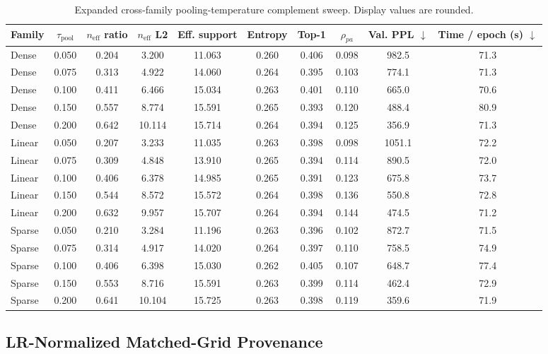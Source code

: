 \documentclass{article}
\theoremstyle{plain}
\theoremstyle{definition}
\theoremstyle{remark}
\begin{document}
\begin{table}[t]
\centering
\caption{Expanded cross-family pooling-temperature complement sweep. Display values are rounded.}
\label{tab:pooltau-family-complements}
\small
\begin{tabular}{lccccccccc}
\toprule
Family & $\tau_{\mathrm{pool}}$ & $n_{\mathrm{eff}}$ ratio & $n_{\mathrm{eff}}$ L2 & Eff. support & Entropy & Top-1 & $\rho_{pa}$ & Val. PPL $\downarrow$ & Time / epoch (s) $\downarrow$ \\
\midrule
Dense & 0.050 & 0.204 & 3.200 & 11.063 & 0.260 & 0.406 & 0.098 & 982.5 & 71.3 \\
Dense & 0.075 & 0.313 & 4.922 & 14.060 & 0.264 & 0.395 & 0.103 & 774.1 & 71.3 \\
Dense & 0.100 & 0.411 & 6.466 & 15.034 & 0.263 & 0.401 & 0.110 & 665.0 & 70.6 \\
Dense & 0.150 & 0.557 & 8.774 & 15.591 & 0.265 & 0.393 & 0.120 & 488.4 & 80.9 \\
Dense & 0.200 & 0.642 & 10.114 & 15.714 & 0.264 & 0.394 & 0.125 & 356.9 & 71.3 \\
Linear & 0.050 & 0.207 & 3.233 & 11.035 & 0.263 & 0.398 & 0.098 & 1051.1 & 72.2 \\
Linear & 0.075 & 0.309 & 4.848 & 13.910 & 0.265 & 0.394 & 0.114 & 890.5 & 72.0 \\
Linear & 0.100 & 0.406 & 6.378 & 14.985 & 0.265 & 0.391 & 0.123 & 675.8 & 73.7 \\
Linear & 0.150 & 0.544 & 8.572 & 15.572 & 0.264 & 0.398 & 0.136 & 550.8 & 72.8 \\
Linear & 0.200 & 0.632 & 9.957 & 15.707 & 0.264 & 0.394 & 0.144 & 474.5 & 71.2 \\
Sparse & 0.050 & 0.210 & 3.284 & 11.196 & 0.263 & 0.396 & 0.102 & 872.7 & 71.5 \\
Sparse & 0.075 & 0.314 & 4.917 & 14.020 & 0.264 & 0.397 & 0.110 & 758.5 & 74.9 \\
Sparse & 0.100 & 0.406 & 6.398 & 15.030 & 0.262 & 0.405 & 0.107 & 648.7 & 77.4 \\
Sparse & 0.150 & 0.553 & 8.716 & 15.591 & 0.263 & 0.399 & 0.114 & 462.4 & 72.9 \\
Sparse & 0.200 & 0.641 & 10.104 & 15.725 & 0.263 & 0.398 & 0.119 & 359.6 & 71.9 \\
\bottomrule
\end{tabular}
\end{table}

\fi

\subsection{LR-Normalized Matched-Grid Provenance}
\label{app:partial-lrnorm-slice}
\end{document}
